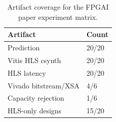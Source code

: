 \begin{table}[t]
\centering
\scriptsize
\setlength{\tabcolsep}{3pt}
\begin{tabular}{ll}
\hline
Artifact & Count \\
\hline
Prediction & 20/20 \\
Vitis HLS csynth & 20/20 \\
HLS latency & 20/20 \\
Vivado bitstream/XSA & 4/6 \\
Capacity rejection & 1/6 \\
HLS-only designs & 15/20 \\
\hline
\end{tabular}
\caption{Artifact coverage for the FPGAI paper experiment matrix.}
\label{tab:table\_arxiv\_artifact\_coverage}
\end{table}
